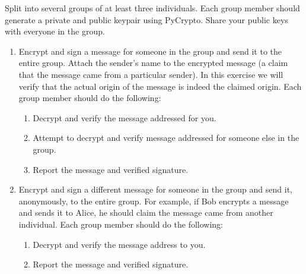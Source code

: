 \begin{problem}
Split into several groups of at least three individuals.
Each group member should generate a private and public keypair using PyCrypto.
Share your public keys with everyone in the group.
\begin{enumerate}
\item Encrypt and sign a message for someone in the group and send it to the entire group.
Attach the sender's name to the encrypted message (a claim that the message came from a particular sender).
In this exercise we will verify that the actual origin of the message is indeed the claimed origin.
Each group member should do the following:
\begin{enumerate}
\item Decrypt and verify the message addressed for you.
\item Attempt to decrypt and verify message addressed for someone else in the group.
\item Report the message and verified signature.
\end{enumerate}

\item Encrypt and sign a different message for someone in the group and send it, anonymously, to the entire group.
For example, if Bob encrypts a message and sends it to Alice, he should claim the message came from another individual.
Each group member should do the following:
\begin{enumerate}
\item Decrypt and verify the message address to you.
\item Report the message and verified signature.
\end{enumerate}
\end{enumerate}
\end{problem}
